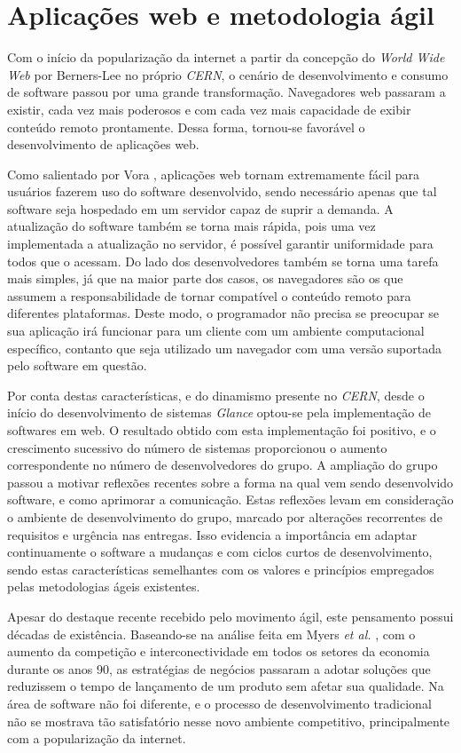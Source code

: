 \section{Aplicações web e metodologia ágil}
Com o início da popularização da internet a partir da concepção do \emph{World Wide Web} por Berners-Lee \cite{Berners-Lee} no próprio \emph{CERN}, o cenário de desenvolvimento e consumo de software passou por uma grande transformação. Navegadores web passaram a existir, cada vez mais poderosos e com cada vez mais capacidade de exibir conteúdo remoto prontamente. Dessa forma, tornou-se favorável o desenvolvimento de aplicações web.

Como salientado por Vora \cite{vora}, aplicações web tornam extremamente fácil para usuários fazerem uso do software desenvolvido, sendo necessário apenas que tal software seja hospedado em um servidor capaz de suprir a demanda. A atualização do software também se torna mais rápida, pois uma vez implementada a atualização no servidor, é possível garantir uniformidade para todos que o acessam. Do lado dos desenvolvedores também se torna uma tarefa mais simples, já que na maior parte dos casos, os navegadores são os que assumem a responsabilidade de tornar compatível o conteúdo remoto para diferentes plataformas. Deste modo, o programador não precisa se preocupar se sua aplicação irá funcionar para um cliente com um ambiente computacional específico, contanto que seja utilizado um navegador com uma versão suportada pelo software em questão.

Por conta destas características, e do dinamismo presente no \emph{CERN}, desde o início do desenvolvimento de sistemas \emph{Glance} optou-se pela implementação de softwares em web. O resultado obtido com esta implementação foi positivo, e o crescimento sucessivo do número de sistemas proporcionou o aumento correspondente no número de desenvolvedores do grupo. A ampliação do grupo passou a motivar reflexões recentes sobre a forma na qual vem sendo desenvolvido software, e como aprimorar a comunicação. Estas reflexões levam em consideração o ambiente de desenvolvimento do grupo, marcado por alterações recorrentes de requisitos e urgência nas entregas. Isso evidencia a importância em adaptar continuamente o software a mudanças e com ciclos curtos de desenvolvimento, sendo estas características semelhantes com os valores e princípios empregados pelas metodologias ágeis existentes.

Apesar do destaque recente recebido pelo movimento ágil, este pensamento possui décadas de existência. Baseando-se na análise feita em Myers \emph{et al.} \cite{myers}, com o aumento da competição e interconectividade em todos os setores da economia durante os anos 90, as estratégias de negócios passaram a adotar soluções que reduzissem o tempo de lançamento de um produto sem afetar sua qualidade. Na área de software não foi diferente, e o processo de desenvolvimento tradicional não se mostrava tão satisfatório nesse novo ambiente competitivo, principalmente com a popularização da internet.


